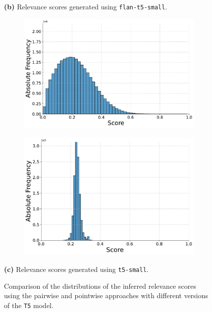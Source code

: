 \begin{figure}[t]
    \vspace{-0.5cm}
    \textbf{(b)} Relevance scores generated using \texttt{flan-t5-small}.
    \vspace{0.5cm}

    \begin{subfigure}[b]{0.49\textwidth}
        \centering
        \includegraphics[width=\textwidth]{graphics/evaluation/pairwise_score_distribution_t5-small.pdf}
        \label{fig:pairwise_t5-small}
    \end{subfigure}
    \hfill
    \begin{subfigure}[b]{0.49\textwidth}
        \centering
        \includegraphics[width=\textwidth]{graphics/evaluation/pointwise_score_distribution_t5-small.pdf}
        \label{fig:pointwise_t5-small}
    \end{subfigure}

    \vspace{-0.5cm}
    \textbf{(c)} Relevance scores generated using \texttt{t5-small}.
    \vspace{0.5cm}

    \caption{Comparison of the distributions of the inferred relevance scores using the pairwise and pointwise approaches with different versions of the \texttt{T5} model.}
    \label{fig:score_distributions}
\end{figure}

